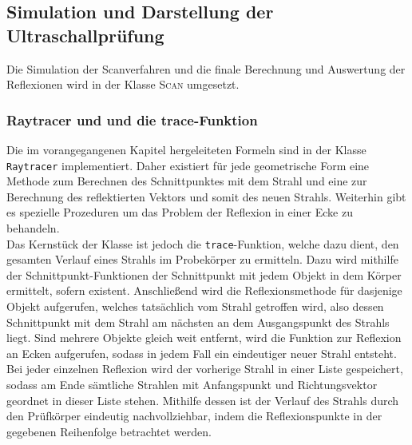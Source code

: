 \documentclass[reducespace,stylepage,semiarbeit]{spezidoc}
\begin{document}
\subsection{Simulation und Darstellung der Ultraschallprüfung}
Die Simulation der Scanverfahren und die finale Berechnung und Auswertung der Reflexionen wird in der Klasse \textsc{Scan} umgesetzt. %

\subsubsection{Raytracer und und die trace-Funktion}
Die im vorangegangenen Kapitel hergeleiteten Formeln sind in der Klasse \texttt{Raytracer} implementiert. Daher existiert für jede geometrische Form eine Methode zum Berechnen des Schnittpunktes mit dem Strahl und eine zur Berechnung des reflektierten Vektors und somit des neuen Strahls. Weiterhin gibt es spezielle Prozeduren um das Problem der Reflexion in einer Ecke zu behandeln.\\
Das Kernstück der Klasse ist jedoch die \texttt{trace}-Funktion, welche dazu dient, den gesamten Verlauf eines Strahls im Probekörper zu ermitteln. Dazu wird mithilfe der Schnittpunkt-Funktionen der Schnittpunkt mit jedem Objekt in dem Körper ermittelt, sofern existent. Anschließend wird die Reflexionsmethode für dasjenige Objekt aufgerufen, welches tatsächlich vom Strahl getroffen wird, also dessen Schnittpunkt mit dem Strahl am nächsten an dem Ausgangspunkt des Strahls liegt. Sind mehrere Objekte gleich weit entfernt, wird die Funktion zur Reflexion an Ecken aufgerufen, sodass in jedem Fall ein eindeutiger neuer Strahl entsteht.\\
Bei jeder einzelnen Reflexion wird der vorherige Strahl in einer Liste gespeichert, sodass am Ende sämtliche Strahlen mit Anfangspunkt und Richtungsvektor geordnet in dieser Liste stehen. Mithilfe dessen ist der Verlauf des Strahls durch den Prüfkörper eindeutig nachvollziehbar, indem die Reflexionspunkte in der gegebenen Reihenfolge betrachtet werden.
\end{document}
